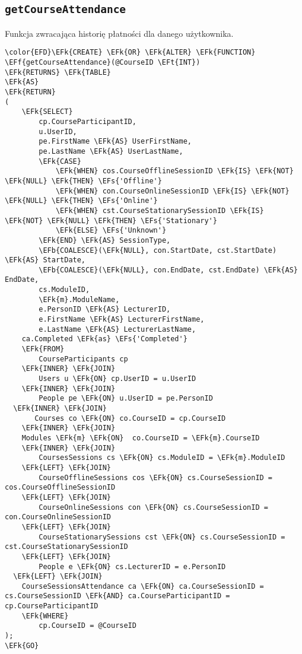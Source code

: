\documentclass[11pt]{article}
\newcommand{\EFs}[1]{\textcolor{EFs}{#1}} %
\newcommand{\EFk}[1]{\textcolor{EFk}{\textbf{#1}}} %
\newcommand{\EFb}[1]{\textcolor{EFb}{\textbf{#1}}} %
\newcommand{\EFf}[1]{\textcolor{EFf}{#1}} %
\newcommand{\EFt}[1]{\textcolor{EFt}{\textbf{#1}}} %
\begin{document}
\subsection{\texttt{getCourseAttendance}}
\label{sec:orga1ca1f0}
Funkcja zwracająca historię płatności dla danego użytkownika.
\begin{Code}
\begin{Verbatim}
\color{EFD}\EFk{CREATE} \EFk{OR} \EFk{ALTER} \EFk{FUNCTION} \EFf{getCourseAttendance}(@CourseID \EFt{INT})
\EFk{RETURNS} \EFk{TABLE}
\EFk{AS}
\EFk{RETURN}
(
    \EFk{SELECT} 
        cp.CourseParticipantID,
        u.UserID,
        pe.FirstName \EFk{AS} UserFirstName,
        pe.LastName \EFk{AS} UserLastName,
        \EFk{CASE} 
            \EFk{WHEN} cos.CourseOfflineSessionID \EFk{IS} \EFk{NOT} \EFk{NULL} \EFk{THEN} \EFs{'Offline'}
            \EFk{WHEN} con.CourseOnlineSessionID \EFk{IS} \EFk{NOT} \EFk{NULL} \EFk{THEN} \EFs{'Online'}
            \EFk{WHEN} cst.CourseStationarySessionID \EFk{IS} \EFk{NOT} \EFk{NULL} \EFk{THEN} \EFs{'Stationary'}
            \EFk{ELSE} \EFs{'Unknown'}
        \EFk{END} \EFk{AS} SessionType,
        \EFb{COALESCE}(\EFk{NULL}, con.StartDate, cst.StartDate) \EFk{AS} StartDate,
        \EFb{COALESCE}(\EFk{NULL}, con.EndDate, cst.EndDate) \EFk{AS} EndDate,
        cs.ModuleID,
        \EFk{m}.ModuleName,
        e.PersonID \EFk{AS} LecturerID,
        e.FirstName \EFk{AS} LecturerFirstName,
        e.LastName \EFk{AS} LecturerLastName,
    ca.Completed \EFk{as} \EFs{'Completed'}
    \EFk{FROM} 
        CourseParticipants cp
    \EFk{INNER} \EFk{JOIN} 
        Users u \EFk{ON} cp.UserID = u.UserID
    \EFk{INNER} \EFk{JOIN} 
        People pe \EFk{ON} u.UserID = pe.PersonID
  \EFk{INNER} \EFk{JOIN}
       Courses co \EFk{ON} co.CourseID = cp.CourseID
    \EFk{INNER} \EFk{JOIN} 
    Modules \EFk{m} \EFk{ON}  co.CourseID = \EFk{m}.CourseID
    \EFk{INNER} \EFk{JOIN} 
        CoursesSessions cs \EFk{ON} cs.ModuleID = \EFk{m}.ModuleID
    \EFk{LEFT} \EFk{JOIN} 
        CourseOfflineSessions cos \EFk{ON} cs.CourseSessionID = cos.CourseOfflineSessionID
    \EFk{LEFT} \EFk{JOIN} 
        CourseOnlineSessions con \EFk{ON} cs.CourseSessionID = con.CourseOnlineSessionID
    \EFk{LEFT} \EFk{JOIN} 
        CourseStationarySessions cst \EFk{ON} cs.CourseSessionID = cst.CourseStationarySessionID
    \EFk{LEFT} \EFk{JOIN} 
        People e \EFk{ON} cs.LecturerID = e.PersonID
  \EFk{LEFT} \EFk{JOIN} 
    CourseSessionsAttendance ca \EFk{ON} ca.CourseSessionID = cs.CourseSessionID \EFk{AND} ca.CourseParticipantID = cp.CourseParticipantID
    \EFk{WHERE} 
        cp.CourseID = @CourseID
);
\EFk{GO}
\end{Verbatim}
\end{Code}
\end{document}
